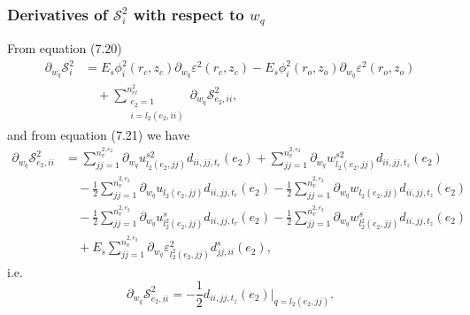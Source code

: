 \documentclass{article}
\begin{document}
\subsubsection{Derivatives of $\mathcal{S}_i^2$ with respect to $w_q$} %
From equation (7.20)
\begin{align}
\partial_{w_q} \mathcal{S}_i^2 &= E_s \phi_i^2(r_c,z_c) \partial_{w_q} \varepsilon^2(r_c,z_c) - E_s \phi_i^2(r_o,z_o) \partial_{w_q} \varepsilon^2(r_o,z_o) \nonumber\\
&\quad + \sum_{\substack{e_2=1\\ i=l_2(e_2,ii)}}^{n_{el}^2} \partial_{w_q} \mathcal{S}_{e_2,ii}^2, \tag{7.27}
\end{align}
and from equation (7.21) we have
\begin{align}
\partial_{w_q} \mathcal{S}_{e_2,ii}^2 &= \sum_{jj=1}^{n_v^{2,e_2}} \partial_{w_q} u_{l_2(e_2,jj)}^{s2} d_{ii,jj,t_r}(e_2) + \sum_{jj=1}^{n_v^{2,e_2}} \partial_{w_q} w_{l_2(e_2,jj)}^{s2} d_{ii,jj,t_z}(e_2) \nonumber\\
&\quad - \frac{1}{2} \sum_{jj=1}^{n_v^{2,e_2}} \partial_{w_q} u_{l_2(e_2,jj)} d_{ii,jj,t_r}(e_2) - \frac{1}{2} \sum_{jj=1}^{n_v^{2,e_2}} \partial_{w_q} w_{l_2(e_2,jj)} d_{ii,jj,t_z}(e_2) \nonumber\\
&\quad - \frac{1}{2} \sum_{jj=1}^{n_v^{2,e_2}} \partial_{w_q} u_{l_2^2(e_2,jj)}^s d_{ii,jj,t_r}(e_2) - \frac{1}{2} \sum_{jj=1}^{n_v^{2,e_2}} \partial_{w_q} w_{l_2^2(e_2,jj)}^s d_{ii,jj,t_z}(e_2) \nonumber\\
&\quad + E_s \sum_{jj=1}^{n_v^{2,e_2}} \partial_{w_q} \varepsilon_{l_2^2(e_2,jj)}^2 d_{jj,ii}^s(e_2), \tag{7.28}
\end{align}
i.e.
\begin{equation}
\partial_{w_q} \mathcal{S}_{e_2,ii}^2 = -\frac{1}{2} d_{ii,jj,t_z}(e_2) \big|_{q=l_2(e_2,jj)}. \tag{7.29}
\end{equation}
\end{document}
